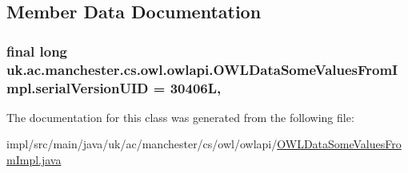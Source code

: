 \subsection{Member Data Documentation}
\hypertarget{classuk_1_1ac_1_1manchester_1_1cs_1_1owl_1_1owlapi_1_1_o_w_l_data_some_values_from_impl_af0d150c8c158766ef54f5ad20469bb84}{
\subsubsection[{serial\-Version\-U\-I\-D}]{\setlength{\rightskip}{0pt plus 5cm}final long uk.\-ac.\-manchester.\-cs.\-owl.\-owlapi.\-O\-W\-L\-Data\-Some\-Values\-From\-Impl.\-serial\-Version\-U\-I\-D = 30406\-L\hspace{0.3cm}{\ttfamily [static]}, {\ttfamily [private]}}}\label{classuk_1_1ac_1_1manchester_1_1cs_1_1owl_1_1owlapi_1_1_o_w_l_data_some_values_from_impl_af0d150c8c158766ef54f5ad20469bb84}


The documentation for this class was generated from the following file\-:\begin{DoxyCompactItemize}
\item 
impl/src/main/java/uk/ac/manchester/cs/owl/owlapi/\hyperlink{_o_w_l_data_some_values_from_impl_8java}{O\-W\-L\-Data\-Some\-Values\-From\-Impl.\-java}\end{DoxyCompactItemize}
